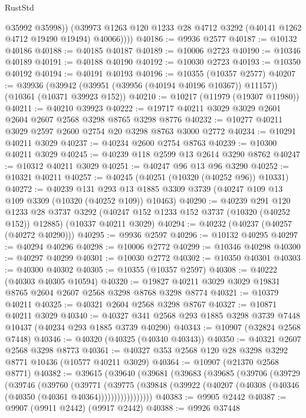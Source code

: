 \begin{lexlean}{RustStd}
\begin{coremodule}
              @35992
              @35998))
          (@39973 @1263 @120 @1233 @28 @4712 @3292 (@40141 @1262 @4712 @19490 @19494) @40066))))
@40186 := @9936 @2577
@40187 := @10132 @40186
@40188 := @40185 @40187
@40189 := @10006 @2723
@40190 := @10346 @40189
@40191 := @40188 @40190
@40192 := @10030 @2723
@40193 := @10350 @40192
@40194 := @40191 @40193
@40196 := @10355 (@10357 @2577)
@40207 := @39936
    (@39942 (@39951 (@39956 (@40194 @40196 @10367)) @11157))
    (@10361 (@10371 @39923 @152))
@40210 := @10217 (@11979 (@19307 @11980))
@40211 := @40210 @39923
@40222 := @19717 @40211 @3029 @3029 @2601 @2604 @2607 @2568 @3298 @8765 @3298 @8776
@40232 := @10277 @40211 @3029 @2597 @2600 @2754 @20 @3298 @8763 @3000 @2772
@40234 := @10291 @40211 @3029
@40237 := @40234 @2600 @2754 @8763
@40239 := @10300 @40211 @3029
@40245 := @40239 @118 @2599 @13 @2614 @3290 @8762
@40247 := @10312 @40211 @3029
@40251 := @40247 @96 @13 @96 @3290
@40252 := @10321 @40211
@40257 := @40245 (@40251 (@10320 (@40252 @96)) @10331)
@40272 := @40239
    @131
    @293
    @13
    @1885
    @3309
    @3739
    (@40247 @109 @13 @109 @3309 (@10320 (@40252 @109)) @10463)
@40290 := @40239
    @291
    @120
    @1233
    @28
    @3737
    @3292
    (@40247 @152 @1233 @152 @3737 (@10320 (@40252 @152)) @12885)
    (@10337 @40211 @3029)
@40294 := @40232 (@40237 (@40257 (@40272 @40290)))
@40295 := @9936 @2597
@40296 := @10132 @40295
@40297 := @40294 @40296
@40298 := @10006 @2772
@40299 := @10346 @40298
@40300 := @40297 @40299
@40301 := @10030 @2772
@40302 := @10350 @40301
@40303 := @40300 @40302
@40305 := @10355 (@10357 @2597)
@40308 := @40222 (@40303 @40305 @10594)
@40320 := @19827 @40211 @3029 @3029 @19831 @8765 @2604 @2607 @2568 @3298 @8768 @3298 @8774
@40321 := @10379 @40211
@40325 := @40321 @2604 @2568 @3298 @8767
@40327 := @10871 @40211 @3029
@40340 := @40327 @341 @2568 @293 @1885 @3298 @3739 @7448 @10437 (@40234 @293 @1885 @3739 @40290)
@40343 := @10907 (@32824 @2568 @7448)
@40346 := @40320 (@40325 (@40340 @40343))
@40350 := @40321 @2607 @2568 @3298 @8773
@40361 := @40327 @353 @2568 @120 @28 @3298 @3292 @8771 @10436 (@10577 @40211 @3029)
@40364 := @10907 (@21370 @2568 @8771)
@40382 := @39615
    (@39640
      (@39681
        (@39683
          (@39685
            (@39706
              (@39729
                (@39746
                  (@39760
                    (@39771
                      (@39775
                        (@39848
                          (@39922 (@40207 (@40308 (@40346 (@40350 (@40361 @40364)))))))))))))))))
@40383 := @9905 @2442
@40387 := @9907 (@9911 @2442) (@9917 @2442)
@40388 := @9926 @37448

\end{coremodule}
\end{lexlean}
